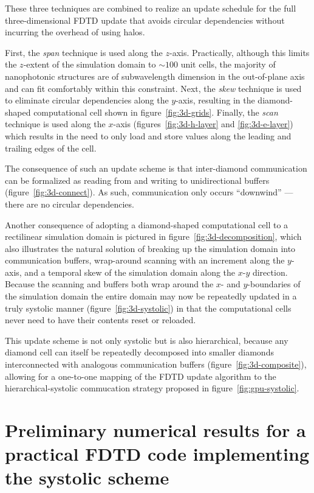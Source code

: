 \documentclass[12pt]{article}
\begin{document}
These three techniques are combined to realize an update schedule
  for the full three-dimensional FDTD update
  that avoids circular dependencies
  without incurring the overhead of using halos.

First, the \emph{span} technique is used along the $z$-axis.
Practically, although this limits the $z$-extent of the simulation domain
  to $\sim 100$ unit cells,
  the majority of nanophotonic structures are of subwavelength dimension
  in the out-of-plane axis
  and can fit comfortably within this constraint.
Next, the \emph{skew} technique is used to eliminate circular dependencies
  along the $y$-axis,
  resulting in the diamond-shaped computational cell
  shown in figure~\ref{fig:3d-grids}.
Finally, the \emph{scan} technique is used along the $x$-axis
  (figures~\ref{fig:3d-h-layer} and \ref{fig:3d-e-layer})
  which results in the need to only load and store values
  along the leading and trailing edges of the cell.

The consequence of such an update scheme is that inter-diamond communication
  can be formalized as reading from and writing to unidirectional buffers
  (figure~\ref{fig:3d-connect}).
As such,
  communication only occurs ``downwind''
  --- there are no circular dependencies.

Another consequence of adopting a diamond-shaped computational cell
  to a rectilinear simulation domain is pictured
  in figure~\ref{fig:3d-decomposition},
  which also illustrates the natural solution
  of breaking up the simulation domain into communication buffers,
  wrap-around scanning with an increment along the $y$-axis,
  and a temporal skew of the simulation domain along the $x$-$y$ direction.
Because the scanning and buffers
  both wrap around the $x$- and $y$-boundaries of the simulation domain
  the entire domain may now be repeatedly updated in a truly systolic manner
  (figure~\ref{fig:3d-systolic}) in that the computational cells
  never need to have their contents reset or reloaded.

This update scheme is not only systolic but is also hierarchical,
  because any diamond cell can itself be repeatedly decomposed
  into smaller diamonds interconnected with analogous communication buffers
  (figure~\ref{fig:3d-composite}),
  allowing for a one-to-one mapping of the FDTD update algorithm
  to the hierarchical-systolic commucation strategy
  proposed in figure~\ref{fig:gpu-systolic}.

\section{Preliminary numerical results for a practical FDTD code
         implementing the systolic scheme}
\end{document}
